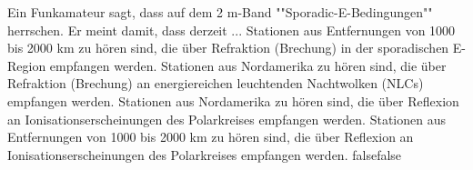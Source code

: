     {Ein Funkamateur sagt, dass auf dem 2 m-Band ""Sporadic-E-Bedingungen"" herrschen. Er meint damit, dass derzeit ...}
    {Stationen aus Entfernungen von 1000 bis 2000 km zu hören sind, die über Refraktion (Brechung) in der sporadischen E-Region empfangen werden.}
    {Stationen aus Nordamerika zu hören sind, die über Refraktion (Brechung) an energiereichen leuchtenden Nachtwolken (NLCs) empfangen werden.}
    {Stationen aus Nordamerika zu hören sind, die über Reflexion an Ionisationserscheinungen des Polarkreises empfangen werden.}
    {Stationen aus Entfernungen von 1000 bis 2000 km zu hören sind, die über Reflexion an Ionisationserscheinungen des Polarkreises empfangen werden.}
    {false}{false}